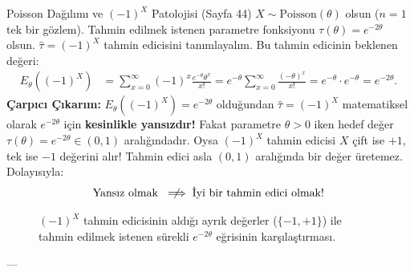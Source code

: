 \documentclass[11pt,a4paper]{article}
\begin{document}
\begin{ornek}{Poisson Dağılımı ve $(-1)^X$ Patolojisi (Sayfa 44)}
$X \sim \text{Poisson}(\theta)$ olsun ($n=1$ tek bir gözlem). Tahmin edilmek istenen parametre fonksiyonu $\tau(\theta) = e^{-2\theta}$ olsun.  
$\hat{\tau} = (-1)^X$ tahmin edicisini tanımlayalım. Bu tahmin edicinin beklenen değeri:
\begin{align*}
E_\theta\left( (-1)^X \right) &= \sum_{x=0}^\infty (-1)^x \frac{e^{-\theta} \theta^x}{x!} = e^{-\theta} \sum_{x=0}^\infty \frac{(-\theta)^x}{x!} = e^{-\theta} \cdot e^{-\theta} = e^{-2\theta}.
\end{align*}
\textbf{Çarpıcı Çıkarım:} $E_\theta\left((-1)^X\right) = e^{-2\theta}$ olduğundan $\hat{\tau} = (-1)^X$ matematiksel olarak $e^{-2\theta}$ için \textbf{kesinlikle yansızdır!}  
Fakat parametre $\theta > 0$ iken hedef değer $\tau(\theta) = e^{-2\theta} \in (0, 1)$ aralığındadır. Oysa $(-1)^X$ tahmin edicisi $X$ çift ise $+1$, tek ise $-1$ değerini alır! Tahmin edici asla $(0, 1)$ aralığında bir değer üretemez. Dolayısıyla:
\[
\text{Yansız olmak } \centernot\implies \text{İyi bir tahmin edici olmak!}
\]
\end{ornek}

\begin{figure}[htbp]
\centering
{}
\caption{$(-1)^X$ tahmin edicisinin aldığı ayrık değerler ($\{-1, +1\}$) ile tahmin edilmek istenen sürekli $e^{-2\theta}$ eğrisinin karşılaştırması.}
\end{figure}

---
\end{document}
